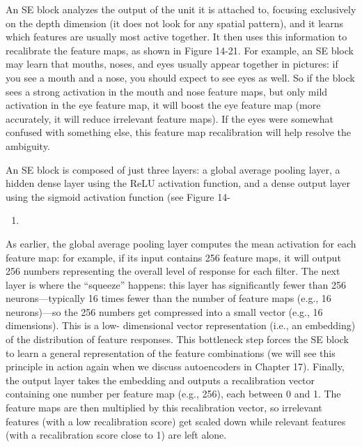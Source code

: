 \documentclass[11pt]{article}
\begin{document}
An SE block analyzes the output of the unit it is attached to, focusing
exclusively on the depth dimension (it does not look for any spatial
pattern), and it learns which features are usually most active together. It
then uses this information to recalibrate the feature maps, as shown in
Figure 14-21. For example, an SE block may learn that mouths, noses, and
eyes usually appear together in pictures: if you see a mouth and a nose,
you should expect to see eyes as well. So if the block sees a strong
activation in the mouth and nose feature maps, but only mild activation in
the eye feature map, it will boost the eye feature map (more accurately, it
will reduce irrelevant feature maps). If the eyes were somewhat confused
with something else, this feature map recalibration will help resolve the
ambiguity.

An SE block is composed of just three layers: a global average pooling
layer, a hidden dense layer using the ReLU activation function, and a
dense output layer using the sigmoid activation function (see Figure 14-
\begin{enumerate}
\item 
\end{enumerate}

As earlier, the global average pooling layer computes the mean activation
for each feature map: for example, if its input contains 256 feature maps,
it will output 256 numbers representing the overall level of response for
each filter. The next layer is where the “squeeze” happens: this layer has
significantly fewer than 256 neurons—typically 16 times fewer than the
number of feature maps (e.g., 16 neurons)—so the 256 numbers get
compressed into a small vector (e.g., 16 dimensions). This is a low-
dimensional vector representation (i.e., an embedding) of the distribution
of feature responses. This bottleneck step forces the SE block to learn a
general representation of the feature combinations (we will see this
principle in action again when we discuss autoencoders in Chapter 17).
Finally, the output layer takes the embedding and outputs a recalibration
vector containing one number per feature map (e.g., 256), each between 0
and 1. The feature maps are then multiplied by this recalibration vector, so
irrelevant features (with a low recalibration score) get scaled down while
relevant features (with a recalibration score close to 1) are left alone.
\end{document}

